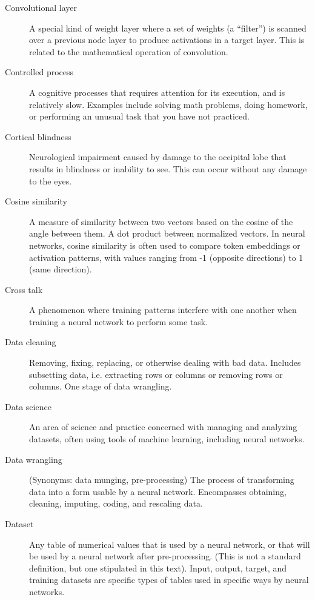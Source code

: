 \begin{description}
\item[Convolutional layer] A special kind of weight layer where a set of weights (a ``filter'') is scanned over a previous node layer to produce activations in a target layer. This is related to the mathematical operation of convolution.

\item[Controlled process] A cognitive processes that requires attention for its execution, and is relatively slow. Examples include solving math problems, doing homework, or performing an unusual task that you have not practiced.

\item[Cortical blindness] Neurological impairment caused by damage to the occipital lobe that results in blindness or inability to see. This can occur without any damage to the eyes. 

\item[Cosine similarity] A measure of similarity between two vectors based on the cosine of the angle between them. A dot product between normalized vectors. In neural networks, cosine similarity is often used to compare token embeddings or activation patterns, with values ranging from -1 (opposite directions) to 1 (same direction).

\item[Cross talk] A phenomenon where training patterns interfere with one another when training a neural network to perform some task. 

\item[Data cleaning] Removing, fixing, replacing, or otherwise dealing with bad data. Includes subsetting data, i.e. extracting rows or columns or removing rows or columns. One stage of data wrangling.

\item[Data science]  An area of science and practice concerned with managing and analyzing datasets, often using tools of machine learning, including neural networks.

\item[Data wrangling] (Synonyms: data munging, pre-processing) The process of transforming data into a form usable by a neural network. Encompasses obtaining, cleaning, imputing, coding, and rescaling data. 

\item[Dataset] Any table of numerical values that is used by a neural network, or that will be used by a neural network after pre-processing. (This is not a standard definition, but one stipulated in this text). Input, output, target, and training datasets are specific types of tables used in specific ways by neural networks.


\end{description}
